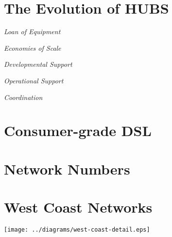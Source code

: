 \documentclass[a4paper,conference,onecolumn]{IEEEtran}
\renewcommand{\subsection}[1]{%
  \vspace{\lineskip}%
  \begin{center}%
    \textit{#1}%
  \end{center}%
  \vspace{\lineskip}%
}
\begin{document}
\newpage
\section{The Evolution of HUBS}

\subsection{Loan of Equipment}
\subsection{Economies of Scale}
\subsection{Developmental Support}
\subsection{Operational Support}
\subsection{Coordination}


\begin{appendices}
  \newpage
  \section{Consumer-grade DSL}
  \label{sec:dsl}

  \newpage
  \section{Network Numbers}
  \label{sec:numbers}

  \newpage
  \section{West Coast Networks}
  \label{sec:wcn}
  \vspace{24pt}
  \begin{center}
    \texttt{[image: ../diagrams/west-coast-detail.eps]}
  \end{center}
\end{appendices}
\end{document}
